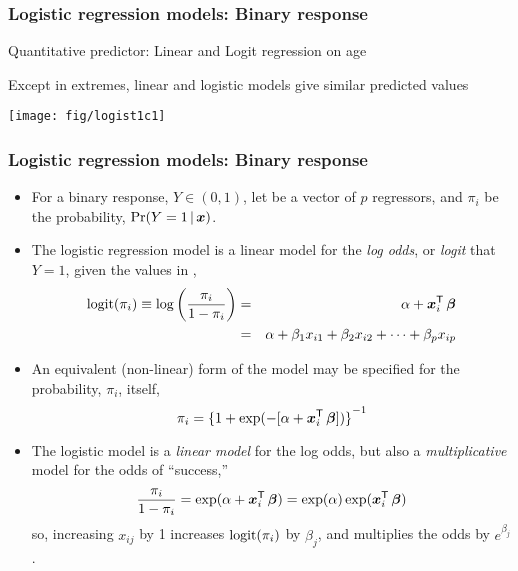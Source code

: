 \begin{frame}
  \frametitle{Logistic regression models: Binary response}
Quantitative predictor: Linear and Logit regression on age
  \begin{itemize*}
	\item Except in extremes, linear
and logistic models give similar predicted values
	\end{itemize*}
\begin{center}
   \texttt{[image: fig/logist1c1]}
\end{center}

\end{frame}

\begin{frame}
  \frametitle{Logistic regression models: Binary response}
  \begin{itemize}[<+->]
	\item For a binary response, $Y \in (0,1)$, 
	let 
	 be a vector of $p$ regressors, and  
	$\pi_i$ be the probability, $\Pr (Y=1 \, | \, \bm{x})$. 
	\item The logistic regression
	model is a linear model for the \emph{log odds}, or \emph{logit}
	that $Y=1$, given the values in ,
\begin{eqnarray*}
  \logit ( \pi_{i}) \equiv \log \left( \frac{\pi_i}{1 - \pi_i}  \right)
   &=& \alpha + \vec{x}_{i}\trans \,  \vec{\beta} \\ %
   &=& \alpha + \beta_1 x_{i1} + \beta_2 x_{i2} + \cdots + \beta_p x_{ip}
   \nonumber
\end{eqnarray*}
	\item An equivalent (non-linear) form of the model may be specified for
	the probability,  $\pi_i$, itself,
\begin{equation*}
    \pi_i = {\{ 1 + \exp ( -[\alpha + \bm{x}_{i}^\mathsf{T} \,  \bm{\beta} ] ) \}}^{-1}
\end{equation*}

	\item The logistic model is a \emph{linear model} for the log odds, but also a
	\emph{multiplicative} model for the odds of ``success,''
\begin{equation*}
\frac{\pi_i}{1 - \pi_i} = \exp( \alpha + \bm{x}_{i}^\mathsf{T} \,  \bm{\beta} )
   = \exp(\alpha) \exp ( \bm{x}_{i}^\mathsf{T} \,  \bm{\beta} )
\end{equation*}
so, increasing $x_{ij}$ by 1 increases $\logit ( \pi_{i})$ by $\beta_j$,
and multiplies the odds by $e^{\beta_j}$.
  \end{itemize}
\end{frame}

